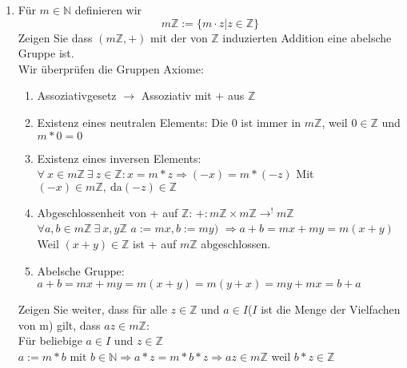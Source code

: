 \documentclass{article}
\begin{document}
\begin{enumerate}[label= (\roman*)]
                \item Für \(m \in \mathbb{N}\) definieren wir
                    \begin{equation*}
                        m\mathbb{Z} := \{m \cdot z | z \in \mathbb{Z}\}
                    \end{equation*}
                    Zeigen Sie dass \((m\mathbb{Z}, +)\) mit der von \(\mathbb{Z}\) induzierten Addition eine abelsche Gruppe ist. \\
                    Wir überprüfen die Gruppen Axiome: \\
                    \begin{enumerate}[label = (\alph*)]
                        \item Assoziativgesetz
                        \(\rightarrow \) Assoziativ mit \(+\) aus \(\mathbb{Z}\)
                        \item Existenz eines neutralen Elements:
                        Die 0 ist immer in \(m\mathbb{Z}\), weil \(0 \in \mathbb{Z}\) und \(m*0 = 0\)
                        \item Existenz eines inversen Elements:
                        \(\forall \: x \in m\mathbb{Z} \: \exists \: z \in \mathbb{Z}: x = m*z \Rightarrow (-x)= m*(-z)\)
                        Mit \((-x) \in m\mathbb{Z}, \: \text{da} (-z) \in \mathbb{Z}\)
                        \item Abgeschlossenheit von + auf \(\mathbb{Z}\):
                        \(+: m\mathbb{Z} \times m\mathbb{Z} \to^{!} m\mathbb{Z}\) \\
                        \(\forall a,b \in m\mathbb{Z} \: \exists \: x,y \mathbb{Z}\)
                        \(a := mx, b:= my)\)
                        \(\Rightarrow a+b = mx + my = m(x + y)\)
                        Weil \((x+y) \in \mathbb{Z}\) ist + auf \(m\mathbb{Z}\) abgeschlossen.
                        \item Abelsche Gruppe:
                        \(
                            a + b = mx + my = m (x + y) = m(y + x) = my + mx = b + a
                        \)
                    \end{enumerate}
                    Zeigen Sie weiter, dass für alle \(z \in \mathbb{Z}\) und \(a \in I\)(\(I\) ist die Menge der Vielfachen von m) gilt, dass \(az \in m\mathbb{Z}\): \\
                    Für beliebige \(a \in I\) und \(z \in \mathbb{Z}\) \\
                    \(a := m * b \text{ mit } b \in \mathbb{N} \Rightarrow a * z = m * b * z \Rightarrow az \in m\mathbb{Z} \) weil \(b*z \in \mathbb{Z}\)

                \end{enumerate}
\end{document}
